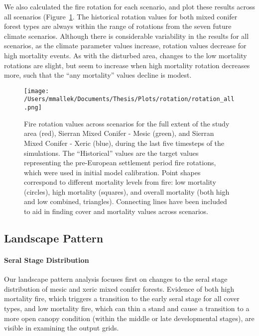 We also calculated the fire rotation for each scenario, and plot these results across all scenarios (Figure~\ref{fig:frotation}. The historical rotation values for both mixed conifer forest types are always within the range of rotations from the seven future climate scenarios. Although there is considerable variability in the results for all scenarios, as the climate parameter values increase, rotation values decrease for high mortality events. As with the disturbed area, changes to the low mortality rotations are slight, but seem to increase when high mortality rotation decreases more, such that the ``any mortality'' values decline is modest.



\begin{figure}
\centering
\texttt{[image: /Users/mmallek/Documents/Thesis/Plots/rotation/rotation\_all.png]}
\caption{Fire rotation values across scenarios for the full extent of the study area (red), Sierran Mixed Conifer - Mesic (green), and Sierran Mixed Conifer - Xeric (blue), during the last five timesteps of the simulations. The ``Historical'' values are the target values representing the pre-European settlement period fire rotations, which were used in initial model calibration. Point shapes correspond to different mortality levels from fire: low mortality (circles), high mortality (squares), and overall mortality (both high and low combined, triangles). Connecting lines have been included to aid in finding cover and mortality values across scenarios.}
\label{fig:frotation}
\end{figure}



\subsection*{Landscape Pattern}

\paragraph{Seral Stage Distribution}
Our landscape pattern analysis focuses first on changes to the seral stage distribution of mesic and xeric mixed conifer forests. Evidence of both high mortality fire, which triggers a transition to the early seral stage for all cover types, and low mortality fire, which can thin a stand and cause a transition to a more open canopy condition (within the middle or late developmental stages), are visible in examining the output grids.


